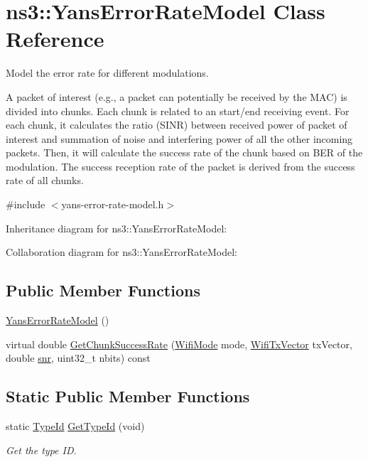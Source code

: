 \hypertarget{classns3_1_1YansErrorRateModel}{}\section{ns3\+:\+:Yans\+Error\+Rate\+Model Class Reference}
\label{classns3_1_1YansErrorRateModel}


Model the error rate for different modulations.

A packet of interest (e.\+g., a packet can potentially be received by the M\+AC) is divided into chunks. Each chunk is related to an start/end receiving event. For each chunk, it calculates the ratio (S\+I\+NR) between received power of packet of interest and summation of noise and interfering power of all the other incoming packets. Then, it will calculate the success rate of the chunk based on B\+ER of the modulation. The success reception rate of the packet is derived from the success rate of all chunks.  




{\ttfamily \#include $<$yans-\/error-\/rate-\/model.\+h$>$}



Inheritance diagram for ns3\+:\+:Yans\+Error\+Rate\+Model\+:


Collaboration diagram for ns3\+:\+:Yans\+Error\+Rate\+Model\+:
\subsection*{Public Member Functions}
\begin{DoxyCompactItemize}
\item 
\hyperlink{classns3_1_1YansErrorRateModel_a24d2e504e3ef5c24c23dbd224680d7e5}{Yans\+Error\+Rate\+Model} ()
\item 
virtual double \hyperlink{classns3_1_1YansErrorRateModel_a9ee90c83f09b4a0a6d53e4df536beee1}{Get\+Chunk\+Success\+Rate} (\hyperlink{classns3_1_1WifiMode}{Wifi\+Mode} mode, \hyperlink{classns3_1_1WifiTxVector}{Wifi\+Tx\+Vector} tx\+Vector, double \hyperlink{lte__pathloss_8m_ae6e82a215dff6b79fb6e9952a1b78453}{snr}, uint32\+\_\+t nbits) const 
\end{DoxyCompactItemize}
\subsection*{Static Public Member Functions}
\begin{DoxyCompactItemize}
\item 
static \hyperlink{classns3_1_1TypeId}{Type\+Id} \hyperlink{classns3_1_1YansErrorRateModel_aeb88d36a5694015fedcecdc13c8e29a6}{Get\+Type\+Id} (void)
\begin{DoxyCompactList}\small\item\em Get the type ID. \end{DoxyCompactList}\end{DoxyCompactItemize}
